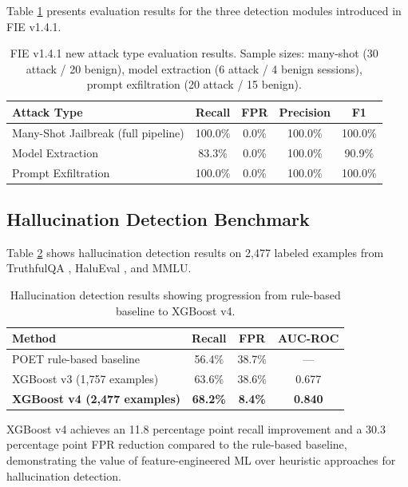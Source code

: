 \documentclass[preprint,12pt,authoryear]{elsarticle}
\begin{document}
Table \ref{tab:newattacks} presents evaluation results for the three
detection modules introduced in FIE v1.4.1.

\begin{table}[H]
\centering
\caption{FIE v1.4.1 new attack type evaluation results.
Sample sizes: many-shot (30 attack / 20 benign), model extraction
(6 attack / 4 benign sessions), prompt exfiltration (20 attack /
15 benign).}
\label{tab:newattacks}
\begin{tabular}{lcccc}
\toprule
\textbf{Attack Type} & \textbf{Recall} & \textbf{FPR}
  & \textbf{Precision} & \textbf{F1} \\
\midrule
Many-Shot Jailbreak (full pipeline) & 100.0\% & 0.0\% & 100.0\% & 100.0\% \\
Model Extraction & 83.3\% & 0.0\% & 100.0\% & 90.9\% \\
Prompt Exfiltration & 100.0\% & 0.0\% & 100.0\% & 100.0\% \\
\bottomrule
\end{tabular}
\end{table}

\subsection{Hallucination Detection Benchmark}

Table \ref{tab:hallucination} shows hallucination detection results on
2,477 labeled examples from TruthfulQA \citep{lin2022truthfulqa},
HaluEval \citep{li2023halueval}, and MMLU.

\begin{table}[H]
\centering
\caption{Hallucination detection results showing progression from
rule-based baseline to XGBoost v4.}
\label{tab:hallucination}
\begin{tabular}{lccc}
\toprule
\textbf{Method} & \textbf{Recall} & \textbf{FPR} & \textbf{AUC-ROC} \\
\midrule
POET rule-based baseline & 56.4\% & 38.7\% & --- \\
XGBoost v3 (1,757 examples) & 63.6\% & 38.6\% & 0.677 \\
\textbf{XGBoost v4 (2,477 examples)} & \textbf{68.2\%} & \textbf{8.4\%}
  & \textbf{0.840} \\
\bottomrule
\end{tabular}
\end{table}

XGBoost v4 achieves an 11.8 percentage point recall improvement and
a 30.3 percentage point FPR reduction compared to the rule-based
baseline, demonstrating the value of feature-engineered ML over
heuristic approaches for hallucination detection.
\end{document}
